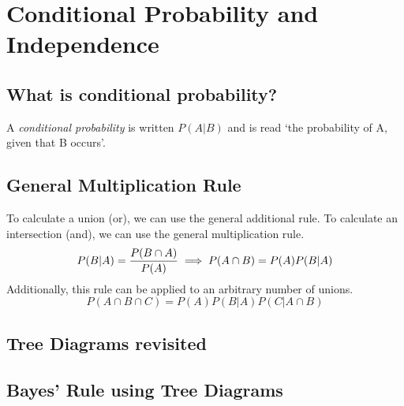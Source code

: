 \section{Conditional Probability and Independence}  %
\subsection{What is conditional probability?}  %
A \emph{conditional probability} is written $P(A\vert B)$ and is read `the probability of A, given that B occurs'.

\subsection{General Multiplication Rule}  %
To calculate a union (or), we can use the general additional rule. To calculate an intersection (and), we can use the general multiplication rule.
\begin{equation}
    P(B\vert A)=\frac{P(B\cap A)}{P(A)} \implies P(A\cap B) = P(A)P(B\vert A) \\
\end{equation}
Additionally, this rule can be applied to an arbitrary number of unions.
\begin{equation}
    P(A\cap B\cap C)=P(A)P(B\vert A)P(C\vert A\cap B)
\end{equation}
\subsection{Tree Diagrams revisited}  %
\subsection{Bayes' Rule using Tree Diagrams}  %
